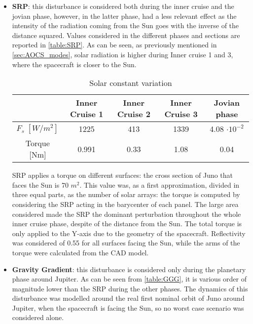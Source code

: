 \begin{itemize}
    \item \textbf{SRP}: this disturbance is considered both during the inner cruise and the jovian phase, however, in the latter phase, had a less relevant effect as the intensity of the radiation coming from the Sun goes with the inverse of the distance squared. Values considered in the different phases and sections are reported in \autoref{table:SRP}. As can be seen, as previously mentioned in \autoref{sec:AOCS_modes}, solar radiation is higher during Inner cruise 1 and 3, where the spacecraft is closer to the Sun. 
    
    \begin{table}[H]
        \renewcommand{\arraystretch}{1.3}
        \centering
        \begin{tabular}{|c|c|c|c|c|}
            \hline
            &\textbf{Inner Cruise 1} & \textbf{Inner Cruise 2} & \textbf{Inner Cruise 3} & \textbf{Jovian phase} \\
            \hline
            \hline
            $F_{s} \; [W/m^2]$ & 1225 & 413 & 1339 & 4.08 $\cdot 10^{-2}$ \\
            \hline
            Torque [Nm] & 0.991 & 0.33 & 1.08 & 0.04 \\
            \hline
        \end{tabular}
        \caption{Solar constant variation}
        \label{table:SRP}
    \end{table}

    SRP applies a torque on different surfaces: the cross section of Juno that faces the Sun is 70 $m^2$. This value was, as a first approximation, divided in three equal parts, as the number of solar arrays: the torque is computed by considering the SRP acting in the barycenter of each panel. The large area considered made the SRP the dominant perturbation throughout the whole inner cruise phase, despite of the distance from the Sun. The total torque is only applied to the Y-axis due to the geometry of the spacecraft. Reflectivity was considered of 0.55 for all surfaces facing the Sun, while the arms of the torque were calculated from the CAD model. 

    \item \textbf{Gravity Gradient}: this disturbance is considered only during the planetary phase around Jupiter. As can be seen from \autoref{table:GGG}, it is various order of magnitude lower than the SRP during the other phases.  The dynamics of this disturbance was modelled around the real first nominal orbit of Juno around Jupiter, when the spacecraft is facing the Sun, so no worst case scenario was considered alone.   %
    

\end{itemize}
